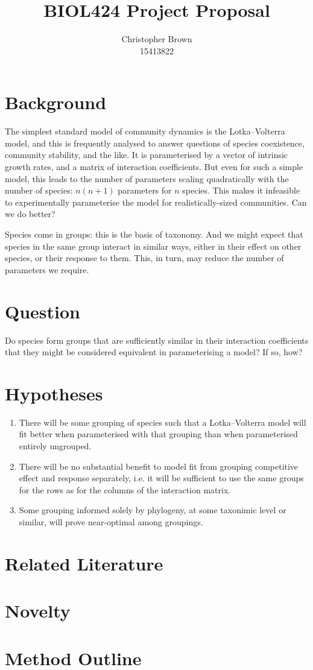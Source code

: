 \documentclass[a4paper,11pt]{article}
\title{BIOL424 Project Proposal}
\author{
	Christopher Brown\\15413822
}
\date{}
\begin{document}
\maketitle

\section{Background}

The simplest standard model of community dynamics is the Lotka--Volterra model, and this is frequently analysed to answer questions of species coexistence, community stability, and the like.
It is parameterised by a vector of intrinsic growth rates, and a matrix of interaction coefficients.
But even for such a simple model, this leads to the number of parameters scaling quadratically with the number of species: $n(n+1)$ parameters for $n$ species.
This makes it infeasible to experimentally parameterise the model for realistically-sized communities.
Can we do better?

Species come in groups: this is the basis of taxonomy.
And we might expect that species in the same group interact in similar ways, either in their effect on other species, or their response to them.
This, in turn, may reduce the number of parameters we require.

\section{Question}

Do species form groups that are sufficiently similar in their interaction coefficients that they might be considered equivalent in parameterising a model?
If so, how?

\section{Hypotheses}

\begin{enumerate}
	\item There will be some grouping of species such that a Lotka--Volterra model will fit better when parameterised with that grouping than when parameterised entirely ungrouped.
	\item There will be no substantial benefit to model fit from grouping competitive effect and response separately, i.e. it will be sufficient to use the same groups for the rows as for the columns of the interaction matrix.
	\item Some grouping informed solely by phylogeny, at some taxonimic level or similar, will prove near-optimal among groupings.
\end{enumerate}

\section{Related Literature}

\section{Novelty}

\section{Method Outline}

\FloatBarrier
\printbibliography
\end{document}
